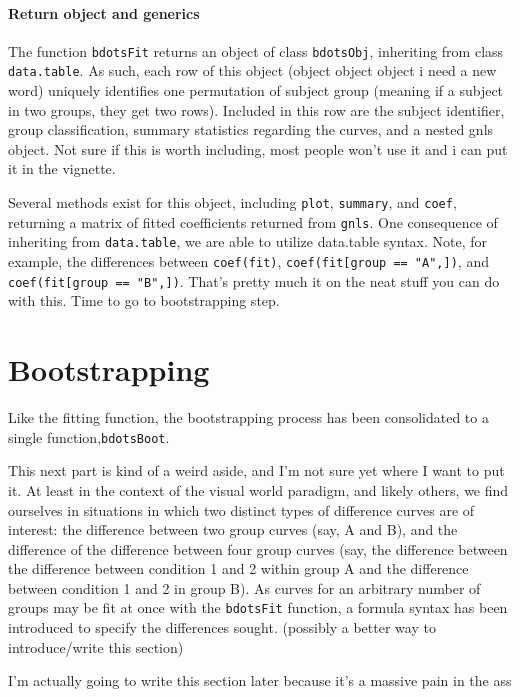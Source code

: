 \documentclass{article}
\begin{document}
\paragraph{Return object and generics}

The function \texttt{bdotsFit} returns an object of class \texttt{bdotsObj}, inheriting from class \texttt{data.table}. As such, each row of this object (object object object i need a new word) uniquely identifies one permutation of subject group (meaning if a subject in two groups, they get two rows). Included in this row are the subject identifier, group classification, summary statistics regarding the curves, and a nested gnls object. Not sure if this is worth including, most people won't use it and i can put it in the vignette.


Several methods exist for this object, including \texttt{plot}, \texttt{summary}, and \texttt{coef}, returning a matrix of fitted coefficients returned from \texttt{gnls}. One consequence of inheriting from \texttt{data.table}, we are able to utilize data.table syntax. Note, for example, the differences between \texttt{coef(fit)}, \texttt{coef(fit[group == "A",])}, and \texttt{coef(fit[group == "B",])}. That's pretty much it on the neat stuff you can do with this. Time to go to bootstrapping step.

\section{Bootstrapping}

Like the fitting function, the bootstrapping process has been consolidated to a single function,\texttt{bdotsBoot}.

This next part is kind of a weird aside, and I'm not sure yet where I want to put it. At least in the context of the visual world paradigm, and likely others, we find ourselves in situations in which two distinct types of difference curves are of interest: the difference between two group curves (say, A and B), and the difference of the difference between four group curves (say, the difference between the difference between condition 1 and 2 within group A and the difference between condition 1 and 2 in group B). As curves for an arbitrary number of groups may be fit at once with the \texttt{bdotsFit} function, a formula syntax has been introduced to specify the differences sought. (possibly a better way to introduce/write this section) 

I'm  actually going to write this section later because it's a massive pain in the ass
\end{document}
